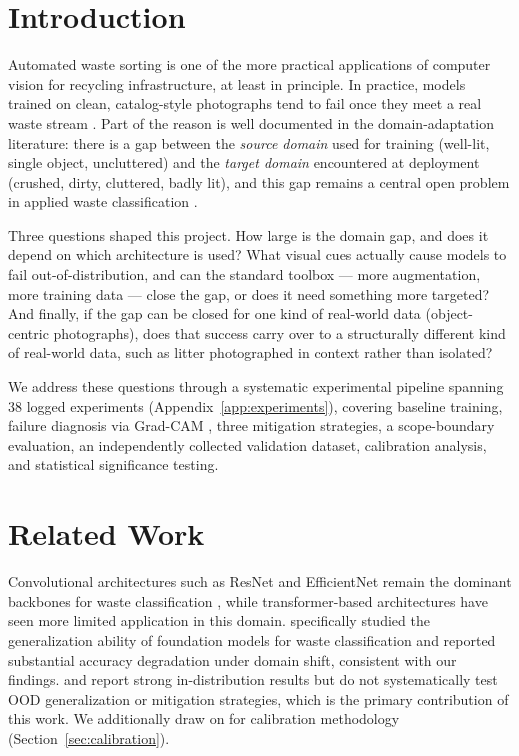 \documentclass[a4paper]{article}
\begin{document}
\section{Introduction}
\label{sec:intro}

Automated waste sorting is one of the more practical applications of computer vision for recycling infrastructure, at least in principle. In practice, models trained on clean, catalog-style photographs tend to fail once they meet a real waste stream \citep{babe2025generalization, hossen2024reliable}. Part of the reason is well documented in the domain-adaptation literature: there is a gap between the \emph{source domain} used for training (well-lit, single object, uncluttered) and the \emph{target domain} encountered at deployment (crushed, dirty, cluttered, badly lit), and this gap remains a central open problem in applied waste classification \citep{abdu2022survey}.

Three questions shaped this project. How large is the domain gap, and does it depend on which architecture is used? What visual cues actually cause models to fail out-of-distribution, and can the standard toolbox --- more augmentation, more training data --- close the gap, or does it need something more targeted? And finally, if the gap can be closed for one kind of real-world data (object-centric photographs), does that success carry over to a structurally different kind of real-world data, such as litter photographed in context rather than isolated?

We address these questions through a systematic experimental pipeline spanning 38 logged experiments (Appendix~\ref{app:experiments}), covering baseline training, failure diagnosis via Grad-CAM \citep{selvaraju2017gradcam}, three mitigation strategies, a scope-boundary evaluation, an independently collected validation dataset, calibration analysis, and statistical significance testing.

\section{Related Work}
\label{sec:related}

Convolutional architectures such as ResNet \citep{He_2016_CVPR} and EfficientNet \citep{tan2019efficientnet} remain the dominant backbones for waste classification \citep{celik2025multilayer, sayem2025enhancing}, while transformer-based architectures \citep{dosovitskiy2021vit} have seen more limited application in this domain. \citet{babe2025generalization} specifically studied the generalization ability of foundation models for waste classification and reported substantial accuracy degradation under domain shift, consistent with our findings. \citet{arishi2025realtime} and \citet{hossen2024reliable} report strong in-distribution results but do not systematically test OOD generalization or mitigation strategies, which is the primary contribution of this work. We additionally draw on \citet{guo2017calibration} for calibration methodology (Section~\ref{sec:calibration}).
\end{document}
